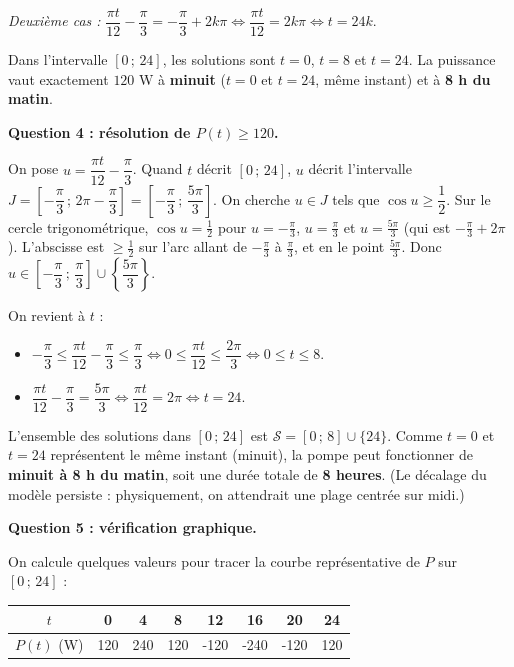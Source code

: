 \documentclass[11pt]{article}
\begin{document}
\begin{exoresolu}
\emph{Deuxième cas :} $\dfrac{\pi t}{12}-\dfrac{\pi}{3}=-\dfrac{\pi}{3}+2k\pi \iff \dfrac{\pi t}{12}=2k\pi \iff t=24k$.

Dans l'intervalle $[0\,;\,24]$, les solutions sont $t=0$, $t=8$ et $t=24$. La puissance vaut exactement $120$ W à \textbf{minuit} ($t=0$ et $t=24$, même instant) et à \textbf{8 h du matin}.

\textbf{Question 4 : résolution de $P(t)\geq 120$.}

On pose $u=\dfrac{\pi t}{12}-\dfrac{\pi}{3}$. Quand $t$ décrit $[0\,;\,24]$, $u$ décrit l'intervalle $J=\left[-\dfrac{\pi}{3}\,;\,2\pi-\dfrac{\pi}{3}\right]=\left[-\dfrac{\pi}{3}\,;\,\dfrac{5\pi}{3}\right]$.
On cherche $u\in J$ tels que $\cos u\geq \dfrac{1}{2}$.
Sur le cercle trigonométrique, $\cos u = \frac{1}{2}$ pour $u=-\frac{\pi}{3}$, $u=\frac{\pi}{3}$ et $u=\frac{5\pi}{3}$ (qui est $-\frac{\pi}{3}+2\pi$). L'abscisse est $\geq \frac{1}{2}$ sur l'arc allant de $-\frac{\pi}{3}$ à $\frac{\pi}{3}$, et en le point $\frac{5\pi}{3}$.
Donc $u\in\left[-\dfrac{\pi}{3}\,;\,\dfrac{\pi}{3}\right] \cup \left\{\dfrac{5\pi}{3}\right\}$.

On revient à $t$ :
\begin{itemize}
\item $-\dfrac{\pi}{3}\leq\dfrac{\pi t}{12}-\dfrac{\pi}{3}\leq\dfrac{\pi}{3} \iff 0\leq\dfrac{\pi t}{12}\leq\dfrac{2\pi}{3} \iff 0\leq t\leq 8$.
\item $\dfrac{\pi t}{12}-\dfrac{\pi}{3}=\dfrac{5\pi}{3} \iff \dfrac{\pi t}{12}=2\pi \iff t=24$.
\end{itemize}
L'ensemble des solutions dans $[0\,;\,24]$ est $\mathcal{S}=[0\,;\,8] \cup \{24\}$. Comme $t=0$ et $t=24$ représentent le même instant (minuit), la pompe peut fonctionner de \textbf{minuit à 8 h du matin}, soit une durée totale de \textbf{8 heures}. (Le décalage du modèle persiste : physiquement, on attendrait une plage centrée sur midi.)

\textbf{Question 5 : vérification graphique.}

On calcule quelques valeurs pour tracer la courbe représentative de $P$ sur $[0\,;\,24]$ :
\begin{center}
\begin{tabular}{|c|c|c|c|c|c|c|c|}\hline
$t$ & 0 & 4 & 8 & 12 & 16 & 20 & 24 \\ \hline
$P(t)$ (W) & 120 & 240 & 120 & -120 & -240 & -120 & 120 \\ \hline
\end{tabular}
\end{center}


\end{exoresolu}
\end{document}
